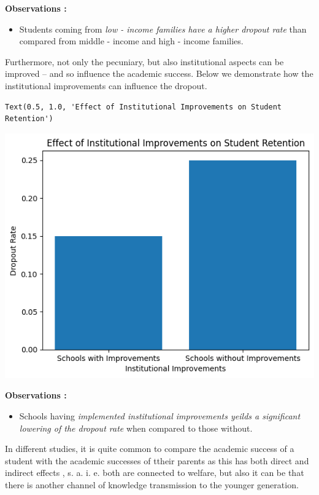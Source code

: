 \documentclass[
  letterpaper,
  DIV=11,
  numbers=noendperiod]{scrartcl}
\providecommand{\tightlist}{%
  \setlength{\itemsep}{0pt}\setlength{\parskip}{0pt}}\usepackage{longtable,booktabs,array}
\begin{document}
\textbf{Observations :}

\begin{itemize}
\tightlist
\item
  Students coming from \emph{low - income families have a higher dropout
  rate} than compared from middle - income and high - income families.
\end{itemize}

Furthermore, not only the pecuniary, but also institutional aspects can
be improved -- and so influence the academic success. Below we
demonstrate how the institutional improvements can influence the
dropout.

\begin{verbatim}
Text(0.5, 1.0, 'Effect of Institutional Improvements on Student Retention')
\end{verbatim}

\includegraphics{report_AzadhdhinNedalYunisAlFraijat_files/figure-pdf/cell-23-output-2.png}

\textbf{Observations :}

\begin{itemize}
\tightlist
\item
  Schools having \emph{implemented institutional improvements yeilds a
  significant lowering of the dropout rate} when compared to those
  without.
\end{itemize}

In different studies, it is quite common to compare the academic success
of a student with the academic successes of ttheir parents as this has
both direct and indirect effects , s. a. i. e. both are connected to
welfare, but also it can be that there is another channel of knowledge
transmission to the younger generation.
\end{document}
